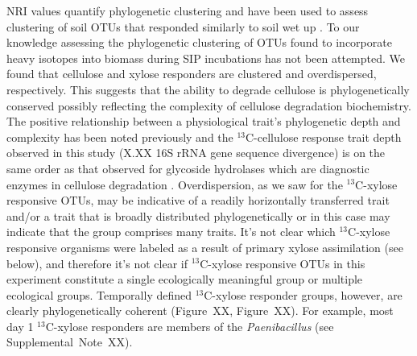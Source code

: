 NRI values quantify phylogenetic clustering \citep{Webb2000} and have 
been used to assess clustering of soil OTUs that responded similarly to soil
wet up \citep{Evans2014a,Placella2012}. To our knowledge assessing the
phylogenetic clustering of OTUs found to incorporate heavy isotopes into
biomass during SIP incubations has not been attempted. We found that cellulose
and xylose responders are clustered and overdispersed, respectively. This
suggests that the ability to degrade cellulose is phylogenetically conserved
possibly reflecting the complexity of cellulose degradation biochemistry. The
positive relationship between a physiological trait's phylogenetic depth and
complexity has been noted previously \citep{Martiny2013a} and the
$^{13}$C-cellulose response trait depth observed in this study (X.XX 16S rRNA
gene sequence divergence) is on the same order as that observed for glycoside
hydrolases which are diagnostic enzymes in cellulose degradation
\citep{Berlemont2013}. Overdispersion, as we saw for the $^{13}$C-xylose
responsive OTUs, may be indicative of a readily horizontally transferred trait
and/or a trait that is broadly distributed phylogenetically or in this case may
indicate that the group comprises many traits. It's not clear which
$^{13}$C-xylose responsive organisms were labeled as a result of primary xylose
assimilation (see below), and therefore it's not clear if $^{13}$C-xylose
responsive OTUs in this experiment constitute a single ecologically meaningful
group or multiple ecological groups. Temporally defined $^{13}$C-xylose
responder groups, however, are clearly phylogenetically coherent (Figure~XX,
Figure~XX). For example, most day 1 $^{13}$C-xylose responders are members of
the \textit{Paenibacillus} (see Supplemental~Note~XX).

